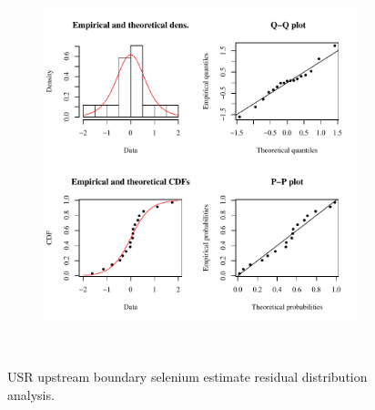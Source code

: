 \begin{landscape}
\begin{figure}
\begin{subfigure}{0.7\textwidth}
			\includegraphics[width=\tableCustomSize]{"Figures/Results_USR/Stochastic/Conc Model res-fit CAN"}
		\end{subfigure}\\
		\caption{USR upstream boundary selenium estimate residual distribution analysis.}
	\end{figure}
\end{landscape}

